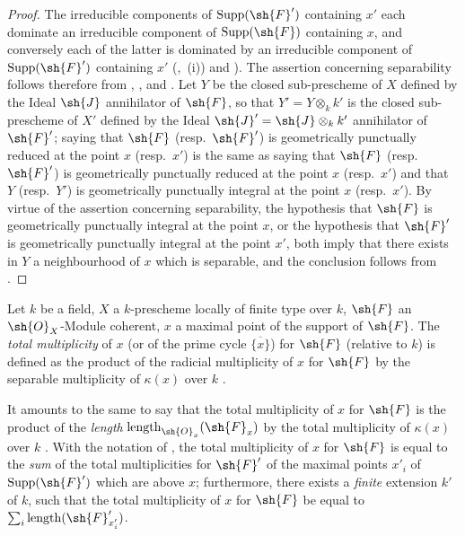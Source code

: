 \begin{proof}
The irreducible components of $\operatorname{Supp}(\sh{F}')$ containing $x'$ each dominate an irreducible component of $\operatorname{Supp}(\sh{F})$ containing $x$, and conversely each of the latter is dominated by an irreducible component of $\operatorname{Supp}(\sh{F}')$ containing $x'$ (,~(i)) and ).
The assertion concerning separability follows therefore from , , and .
Let $Y$ be the closed sub-prescheme of $X$ defined by the Ideal $\sh{J}$ annihilator of $\sh{F}$, so that $Y'=Y\otimes_k k'$ is the closed sub-prescheme of $X'$ defined by the Ideal $\sh{J}'=\sh{J}\otimes_k k'$ annihilator of $\sh{F}'$; saying that $\sh{F}$ (resp.\ $\sh{F}'$) is geometrically punctually reduced at the point $x$ (resp.\ $x'$) is the same as saying that $\sh{F}$ (resp.\ $\sh{F}'$) is geometrically punctually reduced at the point $x$ (resp.\ $x'$) and that $Y$ (resp.\ $Y'$) is geometrically punctually integral at the point $x$ (resp.\ $x'$).
By virtue of the assertion concerning separability, the hypothesis that $\sh{F}$ is geometrically punctually integral at the point $x$, or the hypothesis that $\sh{F}'$ is geometrically punctually integral at the point $x'$, both imply that there exists in $Y$ a neighbourhood of $x$ which is separable, and the conclusion follows from .
\end{proof}

\begin{definition}[4.7.12]
\label{IV.4.7.12}
Let $k$ be a field, $X$ a $k$-prescheme locally of finite type over $k$, $\sh{F}$ an $\sh{O}_X$-Module coherent, $x$ a maximal point of the support of $\sh{F}$.
The \emph{total multiplicity} of $x$ (or of the prime cycle $\overline{\{x\}}$) for $\sh{F}$ (relative to $k$) is defined as the product of the radicial multiplicity of $x$ for $\sh{F}$ by the separable multiplicity of $\kappa(x)$ over $k$ .
\end{definition}

It amounts to the same to say that the total multiplicity of $x$ for $\sh{F}$ is the product of the \emph{length} $\operatorname{length}_{\sh{O}_x}(\sh{F}_x)$ by the total multiplicity of $\kappa(x)$ over $k$ .
With the notation of , the total multiplicity of $x$ for $\sh{F}$ is equal to the \emph{sum} of the total multiplicities for $\sh{F}'$ of the maximal points $x'_i$ of $\operatorname{Supp}(\sh{F}')$ which are above $x$; furthermore, there exists a \emph{finite} extension $k'$ of $k$, such that the total multiplicity of $x$ for $\sh{F}$ be equal to $\sum_i \operatorname{length}(\sh{F}'_{x'_i})$.

